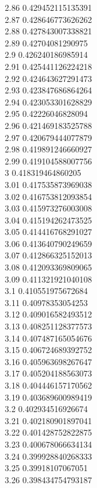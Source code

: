 {2.86	0.429452115135391\\
2.87	0.428646773626262\\
2.88	0.427843007338821\\
2.89	0.42704081290975\\
2.9	0.426240186985914\\
2.91	0.425441126224218\\
2.92	0.424643627291473\\
2.93	0.423847686864264\\
2.94	0.423053301628829\\
2.95	0.42226046828094\\
2.96	0.421469183525788\\
2.97	0.420679444077879\\
2.98	0.419891246660927\\
2.99	0.419104588007756\\
3	0.418319464860205\\
3.01	0.417535873969038\\
3.02	0.416753812093854\\
3.03	0.415973276003008\\
3.04	0.415194262473525\\
3.05	0.414416768291027\\
3.06	0.413640790249659\\
3.07	0.412866325152013\\
3.08	0.412093369809065\\
3.09	0.411321921040108\\
3.1	0.410551975672684\\
3.11	0.40978353054253\\
3.12	0.409016582493512\\
3.13	0.408251128377573\\
3.14	0.407487165054676\\
3.15	0.406724689392752\\
3.16	0.405963698267647\\
3.17	0.405204188563073\\
3.18	0.404446157170562\\
3.19	0.403689600989419\\
3.2	0.402934516926674\\
3.21	0.402180901897041\\
3.22	0.401428752822875\\
3.23	0.400678066634134\\
3.24	0.399928840268333\\
3.25	0.39918107067051\\
3.26	0.398434754793187\\
}
